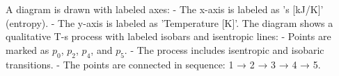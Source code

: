 A diagram is drawn with labeled axes:  
- The x-axis is labeled as 's [kJ/K]' (entropy).  
- The y-axis is labeled as 'Temperature [K]'.  
The diagram shows a qualitative T-s process with labeled isobars and isentropic lines:  
- Points are marked as \( p_0 \), \( p_2 \), \( p_4 \), and \( p_5 \).  
- The process includes isentropic and isobaric transitions.  
- The points are connected in sequence: 1 → 2 → 3 → 4 → 5.